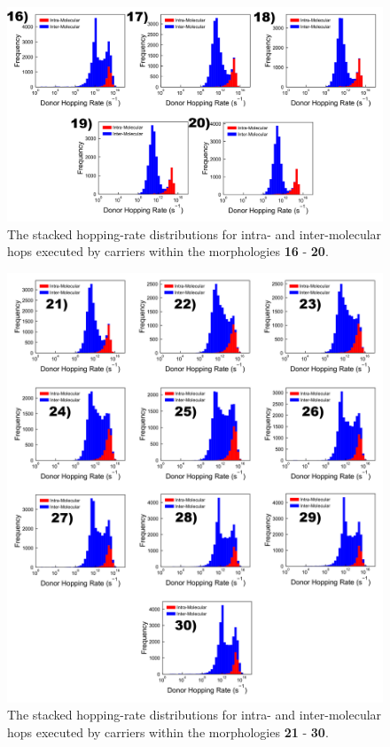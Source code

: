\documentclass[12pt]{article}
\begin{document}
\begin{figure}[h!]\centering
    \includegraphics[width=\textwidth]{Figures/DonorHoppingRateMixedOrig.pdf}
    \caption{The stacked hopping-rate distributions for intra- and inter-molecular hops executed by carriers within the morphologies \textbf{16} - \textbf{20}.}
	\label{fig:HoppingRateMixedOrig}
\end{figure}

\begin{figure}[h!]\centering
    \includegraphics[width=\textwidth]{Figures/DonorHoppingRateMixedFrameOrig.png}
    \caption{The stacked hopping-rate distributions for intra- and inter-molecular hops executed by carriers within the morphologies \textbf{21} - \textbf{30}.}
	\label{fig:HoppingRateMixedFrameOrig}
\end{figure}

\clearpage




\end{document}
